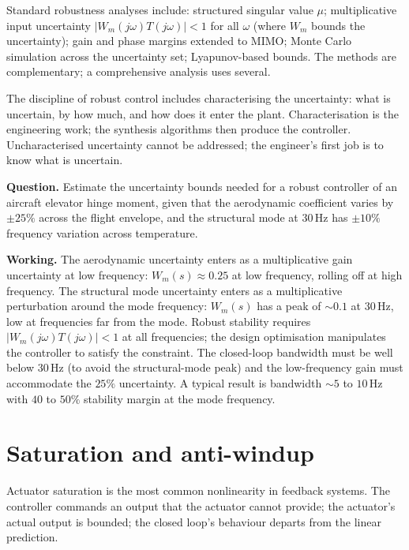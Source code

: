 Standard robustness analyses include: structured singular value $\mu$; multiplicative input uncertainty $|W_m(j\omega) T(j\omega)| < 1$ for all $\omega$ (where $W_m$ bounds the uncertainty); gain and phase margins extended to MIMO; Monte Carlo simulation across the uncertainty set; Lyapunov-based bounds. The methods are complementary; a comprehensive analysis uses several.

The discipline of robust control includes characterising the uncertainty: what is uncertain, by how much, and how does it enter the plant. Characterisation is the engineering work; the synthesis algorithms then produce the controller. Uncharacterised uncertainty cannot be addressed; the engineer's first job is to know what is uncertain.

\begin{estimation}
\textbf{Question.} Estimate the uncertainty bounds needed for a robust controller of an aircraft elevator hinge moment, given that the aerodynamic coefficient varies by $\pm 25\%$ across the flight envelope, and the structural mode at $30\,\text{Hz}$ has $\pm 10\%$ frequency variation across temperature.

\textbf{Working.} The aerodynamic uncertainty enters as a multiplicative gain uncertainty at low frequency: $W_m(s) \approx 0.25$ at low frequency, rolling off at high frequency. The structural mode uncertainty enters as a multiplicative perturbation around the mode frequency: $W_m(s)$ has a peak of $\sim 0.1$ at $30\,\text{Hz}$, low at frequencies far from the mode. Robust stability requires $|W_m(j\omega) T(j\omega)| < 1$ at all frequencies; the design optimisation manipulates the controller to satisfy the constraint. The closed-loop bandwidth must be well below $30\,\text{Hz}$ (to avoid the structural-mode peak) and the low-frequency gain must accommodate the $25\%$ uncertainty. A typical result is bandwidth $\sim 5$ to $10\,\text{Hz}$ with $40$ to $50\%$ stability margin at the mode frequency.
\end{estimation}

\section{Saturation and anti-windup}

Actuator saturation is the most common nonlinearity in feedback systems. The controller commands an output that the actuator cannot provide; the actuator's actual output is bounded; the closed loop's behaviour departs from the linear prediction.

